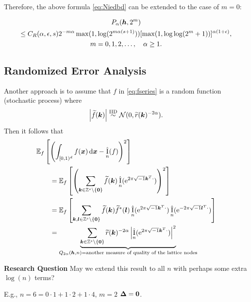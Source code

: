 \documentclass{amsart}
\newcommand{\tr}{\widetilde{r}}
\newcommand{\appxintn}{\appxint_n}
\DeclareMathOperator{\appxint}{\hat{I}}
\begin{document}
Therefore, the above formula \eqref{eq:Niedbd} can be extended to the case of $m=0$:

\begin{multline} \label{eq:Palphaextm}
    P_{\alpha}(\boldsymbol{h},2^m) \\
    \le C_{R}(\alpha,\epsilon,s)
    2^{-m\alpha}\max(1, \log(2^{m\alpha(s+1)})) [\max(1,\log \log (
    2^m+1))]^{\alpha(1+\epsilon)}, \\ m =0, 1, 2,\ldots, \quad \alpha \ge 1.
\end{multline}

\subsection{Randomized Error Analysis}
Another approach is to assume that $f$ in \eqref{eq:fseries} is a random function (stochastic process) where 
\begin{equation}
    \abs{\tf(\vk)} \IIDsim \cn(0,\tr(\vk)^{-2\alpha}).
\end{equation}
Then it follows that 
\begin{align*}
    \MoveEqLeft{\Ex_f\left[\left(\int_{[0,1)^d} f(\vx) \, \dif \vx - \appxintn(f) \right)^2\right]} \\
    & = 
    \Ex_f\left[\left(\sum_{\vk \in \integers^s \setminus\{\vzero\}} \tf(\vk) \appxintn(\me^{2 \pi \sqrt{-1} \vk^T \cdot})\right)^2\right] \\
     & = 
    \Ex_f\left[\sum_{\vk,\vl \in \integers^s \setminus\{\vzero\}} \tf(\vk) \tf^*(\vl) \appxintn(\me^{2 \pi \sqrt{-1} \vk^T \cdot}) \appxintn(\me^{-2 \pi \sqrt{-1} \vl^T \cdot})\right] \\
    & = \underbrace{\sum_{\vk\in \integers^s \setminus\{\vzero\}} \tr(\vk)^{-2\alpha} \abs{\appxintn(\me^{2 \pi \sqrt{-1} \vk^T \cdot})}^2}_{Q_{2\alpha}(\vh,n) = \text{another measure of quality of the lattice nodes}}  \\
\end{align*}

\textbf{Research Question}  May we extend this result to all $n$ with perhaps some extra $\log(n)$ terms?

E.g.,  $n =6 = 0\cdot 1 + 1 \cdot 2 + 1 \cdot 4$, $m = 2$ $\boldsymbol{\Delta} = \boldsymbol{0}$.
\end{document}
